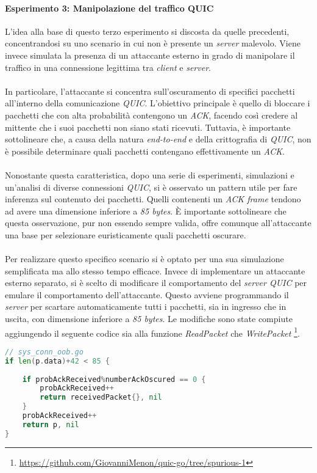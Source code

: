 \paragraph{Esperimento 3: Manipolazione del traffico QUIC }
\noindent L'idea alla base di questo terzo esperimento si discosta da quelle precedenti, concentrandosi su uno scenario in cui non è presente un \emph{server} malevolo.
Viene invece simulata la presenza di un attaccante esterno in grado di manipolare il traffico in una connessione legittima tra \emph{client} e \emph{server}.
\\\\
In particolare, l'attaccante si concentra sull'oscuramento di specifici pacchetti all'interno della comunicazione \emph{QUIC}. 
L'obiettivo principale è quello di bloccare i pacchetti che con alta probabilità contengono un \emph{ACK}, facendo così credere al mittente che i suoi pacchetti non siano stati ricevuti.
Tuttavia, è importante sottolineare che, a causa della natura \emph{end-to-end} e della crittografia di \emph{QUIC}, non è possibile determinare quali pacchetti contengano effettivamente un \emph{ACK}.
\\\\
Nonostante questa caratteristica, dopo una serie di esperimenti, simulazioni e un'analisi di diverse connessioni \emph{QUIC}, si è osservato un pattern utile per fare inferenza sul contenuto dei pacchetti. Quelli contenenti un \emph{ACK frame} tendono ad avere una dimensione inferiore a \emph{85 bytes}.
È importante sottolineare che questa osservazione, pur non essendo sempre valida, offre comunque all'attaccante una base per selezionare euristicamente quali pacchetti oscurare.
\\\\
Per realizzare questo specifico scenario si è optato per una sua simulazione semplificata ma allo stesso tempo efficace. 
Invece di implementare un attaccante esterno separato, si è scelto di modificare il comportamento del \emph{server QUIC} per emulare il comportamento dell'attaccante.
Questo avviene programmando il \emph{server} per scartare automaticamente tutti i pacchetti, sia in ingresso che in uscita, con dimensione inferiore a \emph{85 bytes}.
Le modifiche sono state compiute aggiungendo il seguente codice sia alla funzione \emph{ReadPacket} che \emph{WritePacket} \footnote{\url{https://github.com/GiovanniMenon/quic-go/tree/spurious-1}}.
\begin{lstlisting}[language=Go]
// sys_conn_oob.go
if len(p.data)+42 < 85 {
	
	if probAckReceived%numberAckOscured == 0 {
		probAckReceived++
		return receivedPacket{}, nil
	}
	probAckReceived++
	return p, nil
}
\end{lstlisting}
